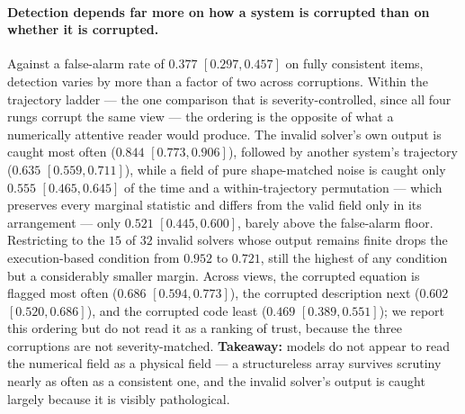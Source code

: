 \paragraph{Detection depends far more on how a system is corrupted than on whether
it is corrupted.}
Against a false-alarm rate of $0.377$ $[0.297, 0.457]$ on fully consistent items,
detection varies by more than a factor of two across corruptions. Within the
trajectory ladder --- the one comparison that is severity-controlled, since all four
rungs corrupt the same view --- the ordering is the opposite of what a numerically
attentive reader would produce. The invalid solver's own output is caught most often
($0.844$ $[0.773, 0.906]$), followed by another system's trajectory ($0.635$
$[0.559, 0.711]$), while a field of pure shape-matched noise is caught only $0.555$
$[0.465, 0.645]$ of the time and a within-trajectory permutation --- which preserves
every marginal statistic and differs from the valid field only in its arrangement
--- only $0.521$ $[0.445, 0.600]$, barely above the false-alarm floor. Restricting
to the $15$ of $32$ invalid solvers whose output remains finite drops the
execution-based condition from $0.952$ to $0.721$, still the highest of any
condition but a considerably smaller margin. Across views, the corrupted equation is
flagged most often ($0.686$ $[0.594, 0.773]$), the corrupted description next
($0.602$ $[0.520, 0.686]$), and the corrupted code least ($0.469$ $[0.389, 0.551]$);
we report this ordering but do not read it as a ranking of trust, because the three
corruptions are not severity-matched. \textbf{Takeaway:} models do not appear to
read the numerical field as a physical field --- a structureless array survives
scrutiny nearly as often as a consistent one, and the invalid solver's output is
caught largely because it is visibly pathological.

